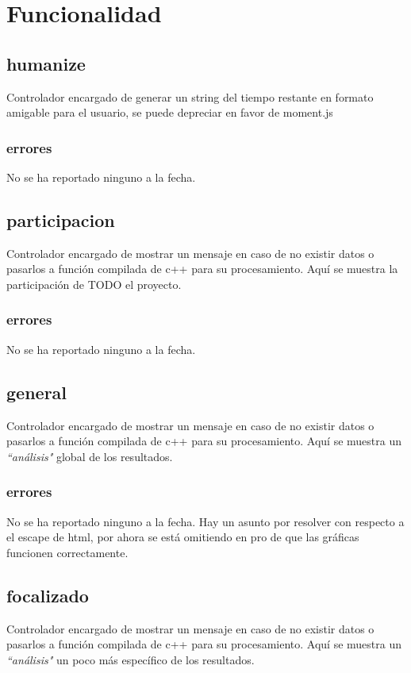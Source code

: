 \documentclass[10pt,a4paper]{book}
\begin{document}
	\section{Funcionalidad}


	\subsection{humanize}
	Controlador encargado de generar un string del tiempo restante en formato amigable para el usuario, se puede depreciar en favor de moment.js
	\subsubsection{errores}
	No se ha reportado ninguno a la fecha.

	\subsection{participacion}
	Controlador encargado de mostrar un mensaje en caso de no existir datos o pasarlos a función compilada de c++ para su procesamiento. Aquí se muestra la participación de TODO el proyecto.
	\subsubsection{errores}
	No se ha reportado ninguno a la fecha.

	\subsection{general}
	Controlador encargado de mostrar un mensaje en caso de no existir datos o pasarlos a función compilada de c++ para su procesamiento. Aquí se muestra un \textit{``análisis"} global de los resultados.
	\subsubsection{errores}
	No se ha reportado ninguno a la fecha. Hay un asunto por resolver con respecto a el escape de html, por ahora se está omitiendo en pro de que las gráficas funcionen correctamente.

	\subsection{focalizado}
	Controlador encargado de mostrar un mensaje en caso de no existir datos o pasarlos a función compilada de c++ para su procesamiento. Aquí se muestra un \textit{``análisis"} un poco más específico de los resultados.
\end{document}
